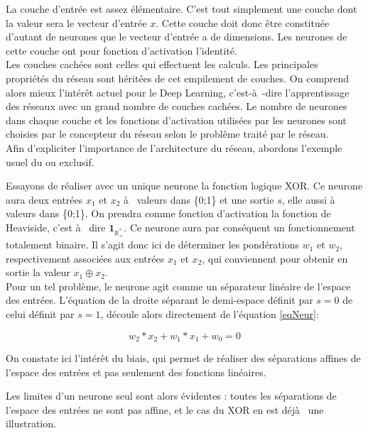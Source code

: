 \documentclass[a4paper,twoside]{report}
\begin{document}
La couche d'entrée est assez élémentaire. C'est tout simplement une couche dont la valeur sera le vecteur d'entrée $x$. Cette couche doit donc être constituée d'autant de neurones que le vecteur d'entrée a de dimensions. Les neurones de cette couche ont pour fonction d'activation l'identité.\\

Les couches cachées sont celles qui effectuent les calculs. Les principales propriétés du réseau sont héritées de cet empilement de couches. On comprend alors mieux l'intérêt actuel pour le Deep Learning, c'est-à -dire l'apprentissage des réseaux avec un grand nombre de couches cachées.
Le nombre de neurones dans chaque couche et les fonctions d'activation utilisées par les neurones sont choisies par le concepteur du réseau selon le problême traité par le réseau.\\

Afin d'expliciter l'importance de l'architecture du réseau, abordons l'exemple usuel du ou exclusif.

Essayons de réaliser avec un unique neurone la fonction logique XOR. Ce neurone aura deux entrées $x_{1}$ et $x_{2}$ à  valeurs dans \{0;1\} et une sortie $s$, elle aussi à  valeurs dans \{0;1\}. On prendra comme fonction d'activation la fonction de Heaviside, c'est à  dire $\mathbf{1}_{\mathbb{R}^{*}_{+}}$. Ce neurone aura par conséquent un fonctionnement totalement binaire. Il s'agit donc ici de déterminer les pondérations $w_{1}$ et $w_{2}$, respectivement associées aux entrées $x_{1}$ et $x_{2}$, qui conviennent pour obtenir en sortie la valeur $x_{1}\oplus x_{2}$.\\

Pour un tel problème, le neurone agit comme un séparateur linéaire de l'espace des entrées. L'équation de la droite séparant le demi-espace définit par $s=0$ de celui définit par $s=1$, découle alors directement de l'équation \ref{eqNeur}:

\begin{equation}w_{2}*x_{2}+w_{1}*x_{1}+w_{0}=0\end{equation}

On constate ici l'intérêt du biais, qui permet de réaliser des séparations affines de l'espace des entrées et pas seulement des fonctions linéaires.

Les limites d'un neurone seul sont alors évidentes : toutes les séparations de l'espace des entrées ne sont pas affine, et le cas du XOR en est déjà  une illustration.\\
\end{document}
